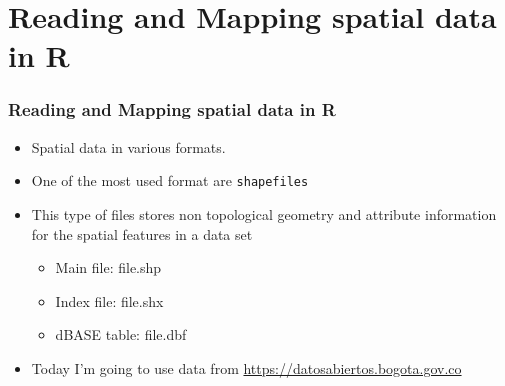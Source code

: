 \documentclass[
  shownotes,
  xcolor={svgnames},
  hyperref={colorlinks,citecolor=DarkBlue,linkcolor=DarkRed,urlcolor=DarkBlue}
  ]{beamer}
\begin{document}
\section{Reading and Mapping spatial data in R}
\begin{frame}[fragile]
\frametitle{Reading and Mapping spatial data in R}

\begin{itemize}
 \item Spatial data in various formats. 
 \bigskip
 \item One of the most used format are \texttt{shapefiles}
 \bigskip
 \item This type of files stores non topological geometry and attribute information for the spatial features in a data set
 \bigskip
\begin{itemize}

\item Main file: file.shp
\item Index file: file.shx
\item dBASE table: file.dbf
\end{itemize}
\bigskip
\item Today I'm going to use data from \url{https://datosabiertos.bogota.gov.co}
\end{itemize}
\end{frame}
\end{document}

